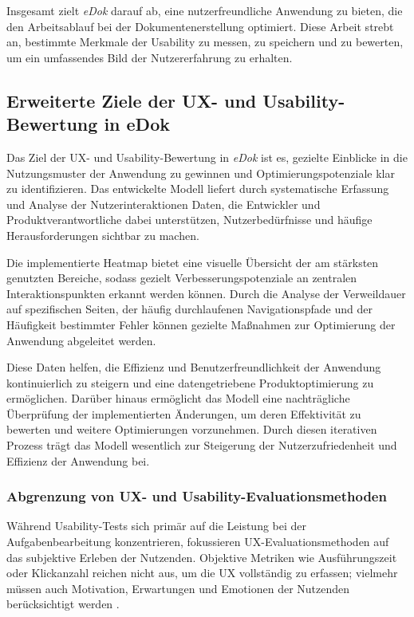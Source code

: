 \documentclass[12pt,oneside]{article}
\begin{document}
Insgesamt zielt \textit{eDok} darauf ab, eine nutzerfreundliche Anwendung zu bieten, die den Arbeitsablauf bei der Dokumentenerstellung optimiert. Diese Arbeit strebt an, bestimmte Merkmale der Usability zu messen, zu speichern und zu bewerten, um ein umfassendes Bild der Nutzererfahrung zu erhalten.

\subsection{Erweiterte Ziele der UX- und Usability-Bewertung in eDok}

Das Ziel der UX- und Usability-Bewertung in \textit{eDok} ist es, gezielte Einblicke in die Nutzungsmuster der Anwendung zu gewinnen und Optimierungspotenziale klar zu identifizieren. Das entwickelte Modell liefert durch systematische Erfassung und Analyse der Nutzerinteraktionen Daten, die Entwickler und Produktverantwortliche dabei unterstützen, Nutzerbedürfnisse und häufige Herausforderungen sichtbar zu machen.

Die implementierte Heatmap bietet eine visuelle Übersicht der am stärksten genutzten Bereiche, sodass gezielt Verbesserungspotenziale an zentralen Interaktionspunkten erkannt werden können. Durch die Analyse der Verweildauer auf spezifischen Seiten, der häufig durchlaufenen Navigationspfade und der Häufigkeit bestimmter Fehler können gezielte Maßnahmen zur Optimierung der Anwendung abgeleitet werden.

Diese Daten helfen, die Effizienz und Benutzerfreundlichkeit der Anwendung kontinuierlich zu steigern und eine datengetriebene Produktoptimierung zu ermöglichen. Darüber hinaus ermöglicht das Modell eine nachträgliche Überprüfung der implementierten Änderungen, um deren Effektivität zu bewerten und weitere Optimierungen vorzunehmen. Durch diesen iterativen Prozess trägt das Modell wesentlich zur Steigerung der Nutzerzufriedenheit und Effizienz der Anwendung bei.

\subsubsection{Abgrenzung von UX- und Usability-Evaluationsmethoden}
Während Usability-Tests sich primär auf die Leistung bei der Aufgabenbearbeitung konzentrieren, fokussieren UX-Evaluationsmethoden auf das subjektive Erleben der Nutzenden. Objektive Metriken wie Ausführungszeit oder Klickanzahl reichen nicht aus, um die UX vollständig zu erfassen; vielmehr müssen auch Motivation, Erwartungen und Emotionen der Nutzenden berücksichtigt werden \cite{dev}.
\end{document}
